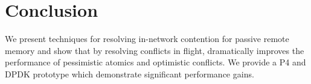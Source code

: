 \section{Conclusion}

We present techniques for resolving in-network contention for passive remote
memory and show that by resolving conflicts in flight, {\sword} dramatically
improves the performance of pessimistic atomics and optimistic conflicts. We
provide a P4 and DPDK prototype which demonstrate significant performance gains.

